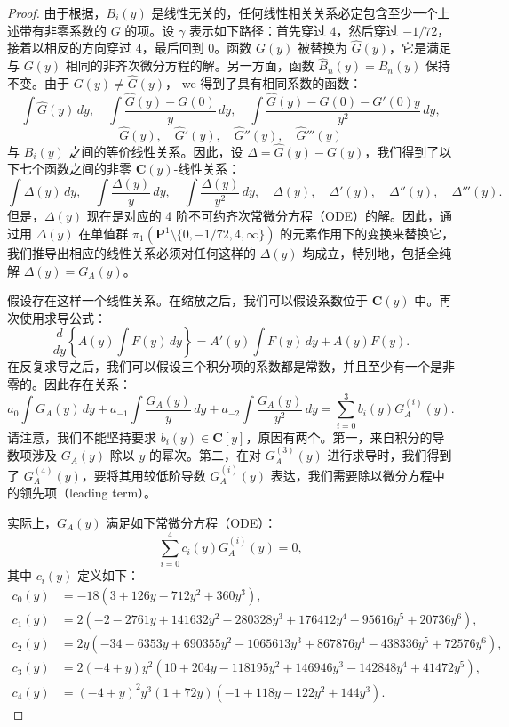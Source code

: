 \begin{proof}
由于根据，$B_i(y)$ 是线性无关的，任何线性相关关系必定包含至少一个上述带有非零系数的 $G$ 的项。设 $\gamma$ 表示如下路径：首先穿过 $4$，然后穿过 $-1/72$，接着以相反的方向穿过 $4$，最后回到 $0$。函数 $G(y)$ 被替换为 $\widehat{G}(y)$，它是满足与 $G(y)$ 相同的非齐次微分方程的解。另一方面，函数 $\widehat{B}_n(y) = B_n(y)$ 保持不变。由于 $G(y) \neq \widehat{G}(y)$， we 得到了具有相同系数的函数：
\[ \int \widehat{G}(y) \, dy, \quad \int \frac{\widehat{G}(y) - G(0)}{y} \, dy, \quad \int \frac{\widehat{G}(y) - G(0) - G'(0)y}{y^2} \, dy, \]
\[ \widehat{G}(y), \quad \widehat{G}'(y), \quad \widehat{G}''(y), \quad \widehat{G}'''(y) \]
与 $B_i(y)$ 之间的等价线性关系。因此，设 $\Delta = \widehat{G}(y) - G(y)$，我们得到了以下七个函数之间的非零 $\mathbf{C}(y)$-线性关系：
\[ \int \Delta(y) \, dy, \quad \int \frac{\Delta(y)}{y} \, dy, \quad \int \frac{\Delta(y)}{y^2} \, dy, \quad \Delta(y), \quad \Delta'(y), \quad \Delta''(y), \quad \Delta'''(y). \]
但是，$\Delta(y)$ 现在是对应的 4 阶不可约齐次常微分方程（ODE）的解。因此，通过用 $\Delta(y)$ 在单值群 $\pi_1(\mathbf{P}^1 \setminus \{0, -1/72, 4, \infty\})$ 的元素作用下的变换来替换它，我们推导出相应的线性关系必须对任何这样的 $\Delta(y)$ 均成立，特别地，包括全纯解 $\Delta(y) = G_A(y)$。

假设存在这样一个线性关系。在缩放之后，我们可以假设系数位于 $\mathbf{C}(y)$ 中。再次使用求导公式：
\begin{equation}\label{eq:12.1.3}\tag{12.1.3}
\frac{d}{dy} \left\{ A(y) \int F(y) \, dy \right\} = A'(y) \int F(y) \, dy + A(y)F(y).
\end{equation}
在反复求导之后，我们可以假设三个积分项的系数都是常数，并且至少有一个是非零的。因此存在关系：
\begin{equation}\label{eq:12.1.4}\tag{12.1.4}
a_0 \int G_A(y) \, dy + a_{-1} \int \frac{G_A(y)}{y} \, dy + a_{-2} \int \frac{G_A(y)}{y^2} \, dy = \sum_{i=0}^3 b_i(y) G_A^{(i)}(y).
\end{equation}
请注意，我们不能坚持要求 $b_i(y) \in \mathbf{C}[y]$，原因有两个。第一，来自积分的导数项涉及 $G_A(y)$ 除以 $y$ 的幂次。第二，在对 $G_A^{(3)}(y)$ 进行求导时，我们得到了 $G_A^{(4)}(y)$，要将其用较低阶导数 $G_A^{(i)}(y)$ 表达，我们需要除以微分方程中的领先项（leading term）。

实际上，$G_A(y)$ 满足如下常微分方程（ODE）：
\[ \sum_{i=0}^{4} c_i(y) G_A^{(i)}(y) = 0, \]
其中 $c_i(y)$ 定义如下：
\begin{equation}\label{eq:12.1.5}\tag{12.1.5}
\begin{aligned}
c_{0}(y) &= -18(3 + 126y - 712y^{2} + 360y^{3}), \\
c_{1}(y) &= 2(-2 - 2761y + 141632y^{2} - 280328y^{3} + 176412y^{4} - 95616y^{5} + 20736y^{6}), \\
c_{2}(y) &= 2y(-34 - 6353y + 690355y^{2} - 1065613y^{3} + 867876y^{4} - 438336y^{5} + 72576y^{6}), \\
c_{3}(y) &= 2(-4 + y)y^{2}(10 + 204y - 118195y^{2} + 146946y^{3} - 142848y^{4} + 41472y^{5}), \\
c_{4}(y) &= (-4 + y)^{2}y^{3}(1 + 72y)(-1 + 118y - 122y^{2} + 144y^{3}).
\end{aligned}
\end{equation}


\end{proof}
